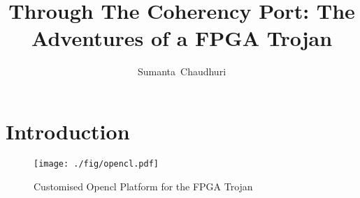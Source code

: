 \documentclass[10pt,journal,compsoc]{IEEEtran}
\begin{document}
\title{Through The Coherency Port: The Adventures of a FPGA Trojan}
\author{Sumanta~Chaudhuri}


\maketitle


\section{Introduction}

\begin{figure*}[!t]
\centering
\texttt{[image: ./fig/opencl.pdf]}
\caption{Customised Opencl Platform for the FPGA Trojan}
\label{fig_dlcs}
\end{figure*}
\end{document}
